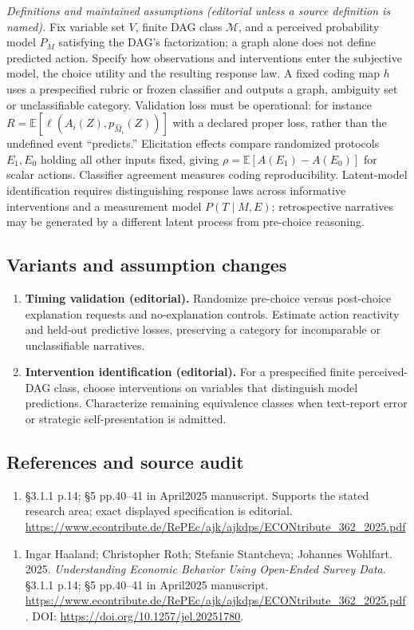 \documentclass[11pt,a4paper]{article}
\begin{document}
\emph{Definitions and maintained assumptions (editorial unless a source definition is named).} Fix variable set \(V\), finite DAG class \(\mathcal M\), and a perceived probability model \(P_M\) satisfying the DAG’s factorization; a graph alone does not define predicted action. Specify how observations and interventions enter the subjective model, the choice utility and the resulting response law. A fixed coding map \(h\) uses a prespecified rubric or frozen classifier and outputs a graph, ambiguity set or unclassifiable category. Validation loss must be operational: for instance \(R=\mathbb E[\ell(A_i(Z),p_{\widehat M_i}(Z))]\) with a declared proper loss, rather than the undefined event ``predicts.'' Elicitation effects compare randomized protocols \(E_1,E_0\) holding all other inputs fixed, giving \(\rho=\mathbb E[A(E_1)-A(E_0)]\) for scalar actions. Classifier agreement measures coding reproducibility. Latent-model identification requires distinguishing response laws across informative interventions and a measurement model \(P(T\mid M,E)\); retrospective narratives may be generated by a different latent process from pre-choice reasoning.
\subsection*{Variants and assumption changes}
\begin{enumerate}
\item \textbf{Timing validation (editorial).} Randomize pre-choice versus post-choice explanation requests and no-explanation controls. Estimate action reactivity and held-out predictive losses, preserving a category for incomparable or unclassifiable narratives.
\item \textbf{Intervention identification (editorial).} For a prespecified finite perceived-DAG class, choose interventions on variables that distinguish model predictions. Characterize remaining equivalence classes when text-report error or strategic self-presentation is admitted.
\end{enumerate}
\subsection*{References and source audit}
\begin{enumerate}
\item §3.1.1 p.14; §5 pp.40–41 in April2025 manuscript. Supports the stated research area; exact displayed specification is editorial. \url{https://www.econtribute.de/RePEc/ajk/ajkdps/ECONtribute_362_2025.pdf}
\end{enumerate}
\begin{enumerate}\raggedright
\item\hypertarget{definitions:source:30007586:1}{} Ingar Haaland; Christopher Roth; Stefanie Stantcheva; Johannes Wohlfart. 2025. \emph{Understanding Economic Behavior Using Open-Ended Survey Data}. §3.1.1 p.14; §5 pp.40–41 in April2025 manuscript.
\url{https://www.econtribute.de/RePEc/ajk/ajkdps/ECONtribute_362_2025.pdf}.
DOI: \url{https://doi.org/10.1257/jel.20251780}.
\end{enumerate}
\end{document}
